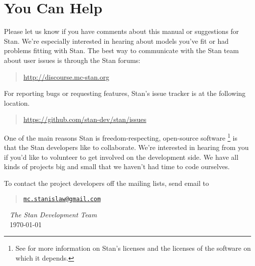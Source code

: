 \section*{You Can Help}

Please let us know if you have comments about this manual or
suggestions for Stan.  We're especially interested in hearing about
models you've fit or had problems fitting with Stan.  The best way to
communicate with the Stan team about user issues is through the
Stan forums:
%
\begin{quote}
\url{http://discourse.mc-stan.org}
\end{quote}
%
For reporting bugs or requesting features, Stan's issue tracker is at
the following location.
%
\begin{quote}
\url{https://github.com/stan-dev/stan/issues}
\end{quote}

One of the main reasons Stan is freedom-respecting, open-source
software%
%
\footnote{See  for more information on Stan's
  licenses and the licenses of the software on which it depends.}
%
is that the Stan developers like to collaborate.  We're interested in
hearing from you if you'd like to volunteer to get involved on the
development side.  We have all kinds of projects big and small that we
haven't had time to code ourselves.

To contact the project developers off the mailing lists, send email to
\begin{quote}
\href{mailto:mc.stanislaw@gmail.com}{\nolinkurl{mc.stanislaw@gmail.com}}
\end{quote}

\vspace*{12pt}
\mbox{ } \hfill {\it The Stan Development Team}
\\
\mbox{ } \hfill \today
